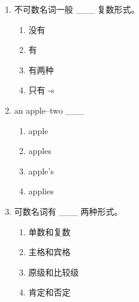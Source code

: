 \documentclass[11pt,a4paper]{ctexart}
\begin{document}
\begin{enumerate}[leftmargin=*,itemsep=4pt]
\item 不可数名词一般 \_\_\_ 复数形式。
\begin{enumerate}[label=\Alph*.,leftmargin=2em,itemsep=1pt,topsep=2pt]
\item 没有
\item 有
\item 有两种
\item 只有 -s
\end{enumerate}
\item an apple–two \_\_\_
\begin{enumerate}[label=\Alph*.,leftmargin=2em,itemsep=1pt,topsep=2pt]
\item apple
\item apples
\item apple’s
\item applies
\end{enumerate}
\item 可数名词有 \_\_\_ 两种形式。
\begin{enumerate}[label=\Alph*.,leftmargin=2em,itemsep=1pt,topsep=2pt]
\item 单数和复数
\item 主格和宾格
\item 原级和比较级
\item 肯定和否定
\end{enumerate}
\end{enumerate}
\end{document}
